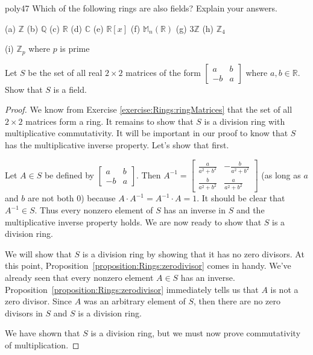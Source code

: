 \begin{exercise}{poly47}
Which of the following rings are also fields?  Explain your answers.

(a) ${\mathbb Z}$\quad
(b) ${\mathbb Q}$\quad
(c) ${\mathbb R}$\quad
(d) ${\mathbb C}$\quad
(e) ${\mathbb R}[x]$\quad  
(f) ${\mathbb M}_n({\mathbb R})$\quad
(g) $3{\mathbb Z}$\quad
(h) ${\mathbb Z}_4$\quad

(i) ${\mathbb Z}_p$ where $p$ is prime
\end{exercise}

\begin{example}{}
Let $S$ be the set of all real $2\times 2$ matrices of the form $\begin{bmatrix}
a & b\\
-b & a 
\end{bmatrix}$
where $a,b\in{\mathbb R}$.  Show that $S$ is a field.

\begin{proof}
We know from Exercise \ref{exercise:Rings:ringMatrices} that the set of all $2\times 2$ matrices form a ring.  It remains to show that $S$ is a division ring with multiplicative commutativity.  It will be important in our proof to know that $S$ has the multiplicative inverse property.  Let's show that first.

Let $A\in S$ be defined by
$\begin{bmatrix}
a & b\\
-b & a
\end{bmatrix}.$
Then $A^{-1}=
\begin{bmatrix}
\frac{a}{a^2+b^2} & -\frac{b}{a^2+b^2}\\
\frac{b}{a^2+b^2} & \frac{a}{a^2+b^2}
\end{bmatrix}$ (as long as $a$ and $b$ are not both 0)
because $A\cdot A^{-1}=A^{-1}\cdot A=1$.  It should be clear that $A^{-1}\in S$.  Thus every nonzero element of $S$ has an inverse in $S$ and the multiplicative inverse property holds.  We are now ready to show that $S$ is a division ring.

We will show that $S$ is a division ring by showing that it has no zero divisors.  At this point, Proposition~\ref{proposition:Rings:zerodivisor} comes in handy.  We've already seen that every nonzero element  $A \in S$ has an inverse. Proposition~\ref{proposition:Rings:zerodivisor} immediately tells us that $A$ is not a zero divisor. Since $A$ was an arbitrary element of $S$, then there are no zero divisors in $S$ and $S$ is a division ring.
  
We have shown that $S$ is a division ring, but we must now prove commutativity of multiplication.


\end{proof}
\end{example}

